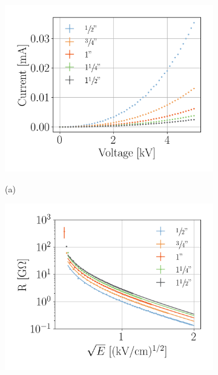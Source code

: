 \documentclass[a4paper,12pt]{article}
\begin{document}
\begin{figure}[htb]
\centering
\begin{subfigure}[c]{0.32\textheight}
\begin{center}
    \includegraphics[width=\textwidth]{TLM_length_current.png}

    \vspace*{-\baselineskip} \hspace{1em} (a)
\end{center}
\end{subfigure}
\begin{subfigure}[c]{0.32\textheight}
\begin{center}
    \includegraphics[width=\textwidth]{TLM_length_resistance.png}


\end{center}
\end{subfigure}
\end{figure}
\end{document}
